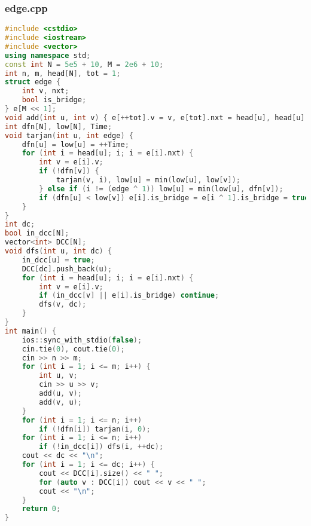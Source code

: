 \documentclass[9pt, a4paper, oneside]{book}
\begin{document}
\subsubsection{edge.cpp}
\begin{lstlisting}[language={C++}]
#include <cstdio>
#include <iostream>
#include <vector>
using namespace std;
const int N = 5e5 + 10, M = 2e6 + 10;
int n, m, head[N], tot = 1;
struct edge {
    int v, nxt;
    bool is_bridge;
} e[M << 1];
void add(int u, int v) { e[++tot].v = v, e[tot].nxt = head[u], head[u] = tot; }
int dfn[N], low[N], Time;
void tarjan(int u, int edge) {
    dfn[u] = low[u] = ++Time;
    for (int i = head[u]; i; i = e[i].nxt) {
        int v = e[i].v;
        if (!dfn[v]) {
            tarjan(v, i), low[u] = min(low[u], low[v]);
        } else if (i != (edge ^ 1)) low[u] = min(low[u], dfn[v]);
        if (dfn[u] < low[v]) e[i].is_bridge = e[i ^ 1].is_bridge = true;
    }
}
int dc;
bool in_dcc[N];
vector<int> DCC[N];
void dfs(int u, int dc) {
    in_dcc[u] = true;
    DCC[dc].push_back(u);
    for (int i = head[u]; i; i = e[i].nxt) {
        int v = e[i].v;
        if (in_dcc[v] || e[i].is_bridge) continue;
        dfs(v, dc);
    }
}
int main() {
    ios::sync_with_stdio(false);
    cin.tie(0), cout.tie(0);
    cin >> n >> m;
    for (int i = 1; i <= m; i++) {
        int u, v;
        cin >> u >> v;
        add(u, v);
        add(v, u);
    }
    for (int i = 1; i <= n; i++)
        if (!dfn[i]) tarjan(i, 0);
    for (int i = 1; i <= n; i++)
        if (!in_dcc[i]) dfs(i, ++dc);
    cout << dc << "\n";
    for (int i = 1; i <= dc; i++) {
        cout << DCC[i].size() << " ";
        for (auto v : DCC[i]) cout << v << " ";
        cout << "\n";
    }
    return 0;
}\end{lstlisting}
\end{document}
